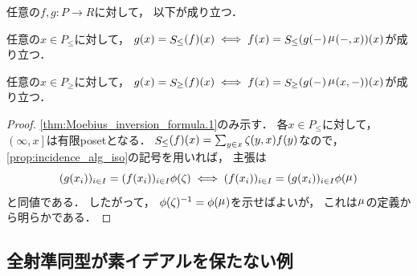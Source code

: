 \documentclass{jlreq}
\newcommand{\MoebiusFunc}[1][\relax]{\mathop{\mu}\nolimits_{#1}}
\newcommand{\LowerSum}{\mathop{S}\nolimits_{\le}}
\newcommand{\UpperSum}{\mathop{S}\nolimits_{\ge}}
\newcommand{\IntervalOC}[2]{\left( #1, #2 \right]}
\newcommand{\PosetZeta}[1][\relax]{\mathop{\zeta}\nolimits_{#1}}
\begin{document}
	\begin{theorem}\label{thm:Moebius_inversion_formula}
		任意の$f, g \colon P \to R$に対して，
		以下が成り立つ．
		\begin{thmenum}
			\item\label{thm:Moebius_inversion_formula.1} 任意の$x \in P_{\le}$に対して，
			$g(x) = \LowerSum(f)(x) \iff f(x) = \LowerSum(g({-})\MoebiusFunc({-}, x))(x)$が成り立つ．
			\item 任意の$x \in P_{\ge}$に対して，
			$g(x) = \UpperSum(f)(x) \iff f(x) = \UpperSum(g({-})\MoebiusFunc(x, {-}))(x)$が成り立つ．
		\end{thmenum}
	\end{theorem}
	
	\begin{proof}
		\cref{thm:Moebius_inversion_formula.1}のみ示す．
		各$x \in P_{\le}$に対して，
		$\IntervalOC{\infty}{x}$は有限posetとなる．
		$\LowerSum(f)(x) = \sum_{y \in x} \PosetZeta(y, x) f(y)$なので，
		\cref{prop:incidence_alg_iso}の記号を用いれば，
		主張は
		\begin{equation}
			(g(x_i))_{i \in I} = (f(x_i))_{i \in I} \phi(\PosetZeta)
			\iff (f(x_i))_{i \in I} = (g(x_i))_{i \in I} \phi(\MoebiusFunc)
		\end{equation}
		と同値である．
		したがって，
		$\phi(\PosetZeta)^{-1} = \phi(\MoebiusFunc)$を示せばよいが，
		これは$\MoebiusFunc$の定義から明らかである．
	\end{proof}
	
	
	\subsection{全射準同型が素イデアルを保たない例}
	
\end{document}
